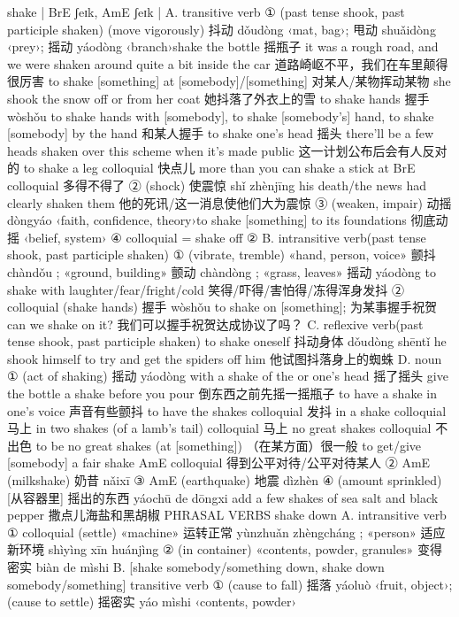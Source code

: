 \documentclass[11pt]{ctexart}
\begin{document}
{{{{shake | BrE ʃeɪk, AmE ʃeɪk |
A. transitive verb
① (past tense shook, past participle shaken) (move vigorously) 抖动 dǒudòng ‹mat, bag›; 甩动 shuǎidòng ‹prey›; 摇动 yáodòng ‹branch›shake the bottle 摇瓶子 it was a rough road, and we were shaken around quite a bit inside the car 道路崎岖不平，我们在车里颠得很厉害 to shake [something] at [somebody]/[something] 对某人/某物挥动某物 she shook the snow off or from her coat 她抖落了外衣上的雪 to shake hands 握手 wòshǒu to shake hands with [somebody], to shake [somebody's] hand, to shake [somebody] by the hand 和某人握手 to shake one's head 摇头 there'll be a few heads shaken over this scheme when it's made public 这一计划公布后会有人反对的 to shake a leg colloquial 快点儿 more than you can shake a stick at BrE colloquial 多得不得了
② (shock) 使震惊 shǐ zhènjīng his death/the news had clearly shaken them 他的死讯/这一消息使他们大为震惊
③ (weaken, impair) 动摇 dòngyáo ‹faith, confidence, theory›to shake [something] to its foundations 彻底动摇 ‹belief, system›
④ colloquial = shake off
②
B. intransitive verb(past tense shook, past participle shaken)
① (vibrate, tremble) «hand, person, voice» 颤抖 chàndǒu ; «ground, building» 颤动 chàndòng ; «grass, leaves» 摇动 yáodòng to shake with laughter/fear/fright/cold 笑得/吓得/害怕得/冻得浑身发抖
② colloquial (shake hands) 握手 wòshǒu to shake on [something]; 为某事握手祝贺 can we shake on it? 我们可以握手祝贺达成协议了吗？
C. reflexive verb(past tense shook, past participle shaken) to shake oneself 抖动身体 dǒudòng shēntǐ he shook himself to try and get the spiders off him 他试图抖落身上的蜘蛛
D. noun
① (act of shaking) 摇动 yáodòng with a shake of the or one's head 摇了摇头 give the bottle a shake before you pour 倒东西之前先摇一摇瓶子 to have a shake in one's voice 声音有些颤抖 to have the shakes colloquial 发抖 in a shake colloquial 马上 in two shakes (of a lamb's tail) colloquial 马上 no great shakes colloquial 不出色 to be no great shakes (at [something]) （在某方面）很一般 to get/give [somebody] a fair shake AmE colloquial 得到公平对待/公平对待某人
② AmE (milkshake) 奶昔 nǎixī
③ AmE (earthquake) 地震 dìzhèn
④ (amount sprinkled) [从容器里] 摇出的东西 yáochū de dōngxi add a few shakes of sea salt and black pepper 撒点儿海盐和黑胡椒 PHRASAL VERBS shake down
A. intransitive verb
① colloquial (settle) «machine» 运转正常 yùnzhuǎn zhèngcháng ; «person» 适应新环境 shìyìng xīn huánjìng
② (in container) «contents, powder, granules» 变得密实 biàn de mìshi
B. [shake somebody/something down, shake down somebody/something] transitive verb
① (cause to fall) 摇落 yáoluò ‹fruit, object›; (cause to settle) 摇密实 yáo mìshi ‹contents, powder›
}}}}
\end{document}
